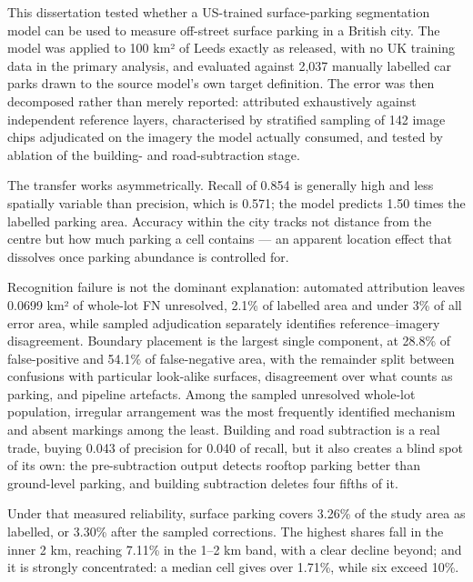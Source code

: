 This dissertation tested whether a US-trained surface-parking segmentation model can be used to measure off-street surface parking in a British city. The model was applied to 100 km² of Leeds exactly as released, with no UK training data in the primary analysis, and evaluated against 2,037 manually labelled car parks drawn to the source model's own target definition. The error was then decomposed rather than merely reported: attributed exhaustively against independent reference layers, characterised by stratified sampling of 142 image chips adjudicated on the imagery the model actually consumed, and tested by ablation of the building- and road-subtraction stage.

The transfer works asymmetrically. Recall of 0.854 is generally high and less spatially variable than precision, which is 0.571; the model predicts 1.50 times the labelled parking area. Accuracy within the city tracks not distance from the centre but how much parking a cell contains --- an apparent location effect that dissolves once parking abundance is controlled for.

Recognition failure is not the dominant explanation: automated attribution leaves 0.0699 km² of whole-lot FN unresolved, 2.1\% of labelled area and under 3\% of all error area, while sampled adjudication separately identifies reference--imagery disagreement. Boundary placement is the largest single component, at 28.8\% of false-positive and 54.1\% of false-negative area, with the remainder split between confusions with particular look-alike surfaces, disagreement over what counts as parking, and pipeline artefacts. Among the sampled unresolved whole-lot population, irregular arrangement was the most frequently identified mechanism and absent markings among the least. Building and road subtraction is a real trade, buying 0.043 of precision for 0.040 of recall, but it also creates a blind spot of its own: the pre-subtraction output detects rooftop parking better than ground-level parking, and building subtraction deletes four fifths of it.

Under that measured reliability, surface parking covers 3.26\% of the study area as labelled, or 3.30\% after the sampled corrections. The highest shares fall in the inner 2 km, reaching 7.11\% in the 1--2 km band, with a clear decline beyond; and it is strongly concentrated: a median cell gives over 1.71\%, while six exceed 10\%.

